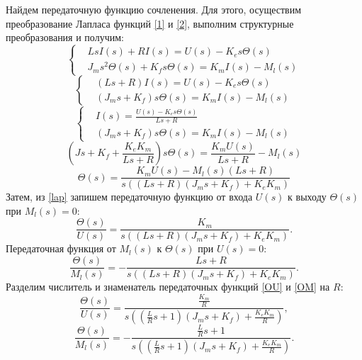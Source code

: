 Найдем передаточную функцию сочленения. Для этого, осуществим преобразование Лапласа функций \eqref{1} и \eqref{2}, выполним структурные преобразования и получим:
\begin{equation}
	\left\{	
		\begin{aligned}
			&LsI(s)+RI(s)=U(s)-K_es\Theta(s)\\
			&J_ms^2\Theta(s) + K_fs\Theta(s) = K_mI(s) - M_l(s)
		\end{aligned}
	\right.
\end{equation}
\begin{equation}
	\left\{	
		\begin{aligned}
			&(Ls+R)I(s)=U(s)-K_es\Theta(s)\\
			&(J_ms + K_f)s\Theta(s) = K_mI(s) - M_l(s)
		\end{aligned}
	\right.
\end{equation}
\begin{equation}
	\left\{	
		\begin{aligned}
			&I(s)=\frac{U(s)-K_es\Theta(s)}{Ls+R}\\
			&(J_ms + K_f)s\Theta(s) = K_mI(s) - M_l(s)
		\end{aligned}
	\right.
\end{equation}
\begin{equation}
	(Js+K_f+\frac{K_eK_m}{Ls+R})s\Theta(s)=\frac{K_mU(s)}{Ls+R}-M_l(s)
\end{equation}
\begin{equation}\label{lap}
	\Theta(s) = \frac{K_mU(s)-M_l(s)(Ls+R)}{s((Ls+R)(J_ms+K_f)+K_eK_m)}
\end{equation}
Затем, из \eqref{lap} запишем передаточную функцию от входа $U(s)$ к выходу $\Theta(s)$ при $M_l(s) = 0$:
\begin{equation}\label{OU}
	\frac{\Theta(s)}{U(s)}=\frac{K_m}{s((Ls+R)(J_ms+K_f)+K_eK_m)}.
\end{equation}
Передаточная функция от $M_l(s)$ к $\Theta(s)$ при $U(s) = 0$: 
\begin{equation}\label{OM}
	\frac{\Theta(s)}{M_l(s)}=-\frac{Ls+R}{s((Ls+R)(J_ms+K_f)+K_eK_m)}.
\end{equation}
Разделим числитель и знаменатель передаточных функций \eqref{OU} и \eqref{OM} на $R$:
\begin{equation}\label{OUR}
	\frac{\Theta(s)}{U(s)}=\frac{\frac{K_m}{R}}{s((\frac{L}{R}s+1)(J_ms+K_f)+\frac{K_eK_m}{R})},
\end{equation}
\begin{equation}\label{OMR}
	\frac{\Theta(s)}{M_l(s)}=-\frac{\frac{L}{R}s+1}{s((\frac{L}{R}s+1)(J_ms+K_f)+\frac{K_eK_m}{R})}.
\end{equation}
